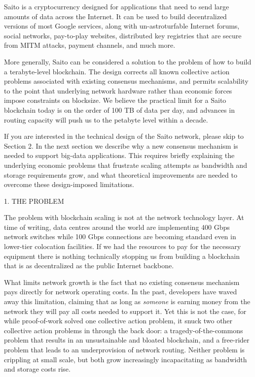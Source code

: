 \documentclass[11.5pt, oneside]{article}   	%
\begin{document}
\begin{multicols}{2}
Saito is a cryptocurrency designed for applications that need to send large amounts of data across the Internet. It can be used to build decentralized versions of most Google services, along with un-astroturfable Internet forums, social networks, pay-to-play websites, distributed key registries that are secure from MITM attacks, payment channels, and much more.

More generally, Saito can be considered a solution to the problem of how to build a terabyte-level blockchain. The design corrects all known collective action problems associated with existing consensus mechanisms, and permits scalability to the point that underlying network hardware rather than economic forces impose constraints on blocksize. We believe the practical limit for a Saito blockchain today is on the order of 100 TB of data per day, and advances in routing capacity will push us to the petabyte level within a decade.

If you are interested in the technical design of the Saito network, please skip to Section 2. In the next section we describe why a new consensus mechanism is needed to support big-data applications. This requires briefly explaining the underlying economic problems that frustrate scaling attempts as bandwidth and storage requirements grow, and what theoretical improvements are needed to overcome these design-imposed limitations.


1. THE PROBLEM

The problem with blockchain scaling is not at the network technology layer. At time of writing, data centres around the world are implementing 400 Gbps network switches while 100 Gbps connections are becoming standard even in lower-tier colocation facilities. If we had the resources to pay for the necessary equipment there is nothing technically stopping us from building a blockchain that is as decentralized as the public Internet backbone.

What limits network growth is the fact that no existing consensus mechanism pays directly for network operating costs. In the past, developers have waved away this limitation, claiming that as long as {\textit{someone}} is earning money from the network they will pay all costs needed to support it. Yet this is not the case, for while proof-of-work solved one collective action problem, it snuck two other collective action problems in through the back door: a tragedy-of-the-commons problem that results in an unsustainable and bloated blockchain, and a free-rider problem that leads to an underprovision of network routing. Neither problem is crippling at small scale, but both grow increasingly incapacitating as bandwidth and storage costs rise.


\end{multicols}
\end{document}
